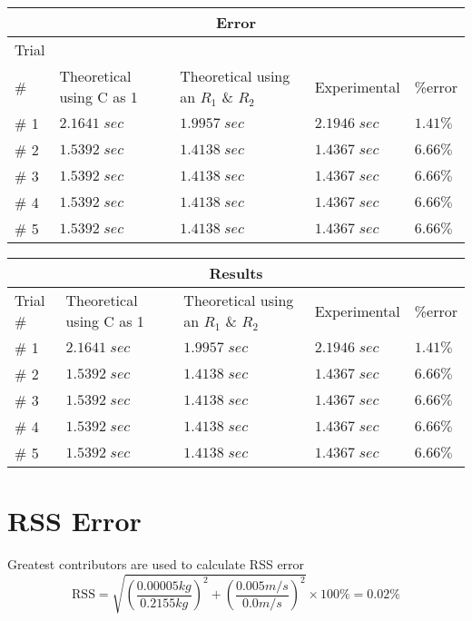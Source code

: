\documentclass{report}
\begin{document}
\begin{center}
  \begin{tabular} { |p{2cm}|p{2cm}|p{2cm}|p{2cm}|p{2cm}| }
    \hline
    \multicolumn{5}{|c|}{ Error } \\
    \hline 
    \centering Trial\\ \# & Theoretical using C as 1 & Theoretical using an $R_1$ \& $R_2$ &  Experimental & \%error \\ 
    \hline
    \# 1& $2.1641 \; sec$ & $1.9957 \; sec$ & $2.1946 \; sec$ & $1.41\%$ \\
    \hline
    \# 2& $1.5392 \; sec$ & $1.4138 \; sec$ & $1.4367 \; sec$ & $6.66\%$ \\
    \hline
    \# 3& $1.5392 \; sec$ & $1.4138 \; sec$ & $1.4367 \; sec$ & $6.66\%$ \\
    \hline
    \# 4& $1.5392 \; sec$ & $1.4138 \; sec$ & $1.4367 \; sec$ & $6.66\%$ \\
    \hline
    \# 5& $1.5392 \; sec$ & $1.4138 \; sec$ & $1.4367 \; sec$ & $6.66\%$ \\
    \hline
  \end{tabular}
\end{center}

\begin{center}
  \begin{tabular} { |p{2cm}|p{2cm}|p{2cm}|p{2cm}|p{2cm}| }
    \hline
    \multicolumn{5}{|c|}{ Results } \\
    \hline 
    \centering Trial # & Theoretical using C as 1 & Theoretical using an $R_1$ \& $R_2$ &  Experimental & \%error \\ 
    \hline
    \# 1& $2.1641 \; sec$ & $1.9957 \; sec$ & $2.1946 \; sec$ & $1.41\%$ \\
    \hline
    \# 2& $1.5392 \; sec$ & $1.4138 \; sec$ & $1.4367 \; sec$ & $6.66\%$ \\
    \hline
    \# 3& $1.5392 \; sec$ & $1.4138 \; sec$ & $1.4367 \; sec$ & $6.66\%$ \\
    \hline
    \# 4& $1.5392 \; sec$ & $1.4138 \; sec$ & $1.4367 \; sec$ & $6.66\%$ \\
    \hline
    \# 5& $1.5392 \; sec$ & $1.4138 \; sec$ & $1.4367 \; sec$ & $6.66\%$ \\
    \hline
  \end{tabular}
\end{center}

\section*{RSS Error}

\begin{center}
  \noindent Greatest contributors are used to calculate RSS error
  \begin{equation*}
      \text{RSS} = \sqrt{ \left( \frac{0.00005kg}{0.2155kg} \right)^2 
      + \left( \frac{0.005 m/s}{0.0m/s} \right)^2}
      \times 100\% = 0.02\%
  \end{equation*}
\end{center}
\end{document}
